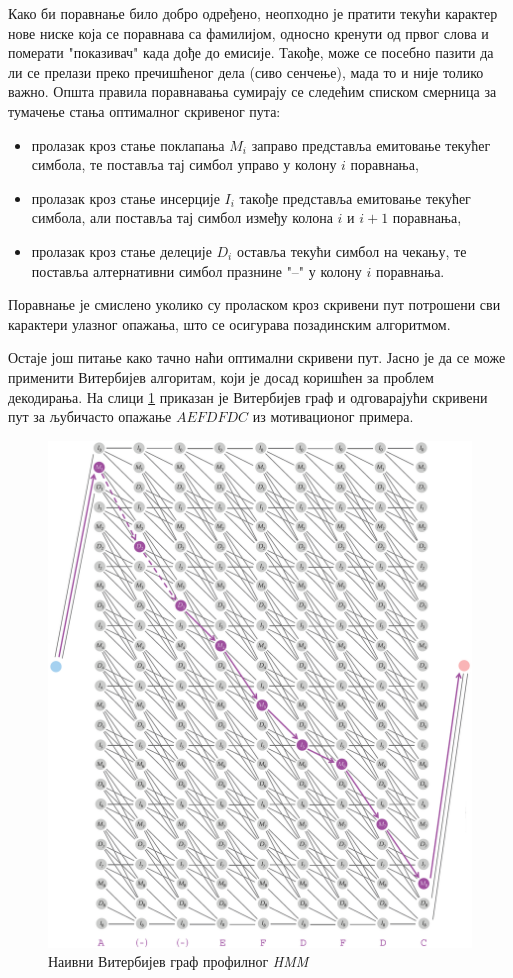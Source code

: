 \documentclass[12pt,oneside]{memoir}
\begin{document}
\begin{CJK}{UTF8}{ipxm}
Како би поравнање било добро одређено, неопходно је пратити текући карактер нове ниске која се поравнава са фамилијом, односно кренути од првог слова и померати "показивач" када дође до емисије. Такође, може се посебно пазити да ли се прелази преко пречишћеног дела (сиво сенчење), мада то и није толико важно. Општа правила поравнавања сумирају се следећим списком смерница за тумачење стања оптималног скривеног пута:
\begin{itemize}
  \item пролазак кроз стање поклапања $M_i$ заправо представља емитовање текућег симбола, те поставља тај симбол управо у колону $i$ поравнања,
  \item пролазак кроз стање инсерције $I_i$ такође представља емитовање текућег симбола, али поставља тај симбол између колона $i$ и $i+1$ поравнања,
  \item пролазак кроз стање делеције $D_i$ оставља текући симбол на чекању, те поставља алтернативни симбол празнине "--" у колону $i$ поравнања.
\end{itemize}
Поравнање је смислено уколико су проласком кроз скривени пут потрошени сви карактери улазног опажања, што се осигурава позадинским алгоритмом.

Остаје још питање како тачно наћи оптимални скривени пут. Јасно је да се може применити Витербијев алгоритам, који је досад коришћен за проблем декодирања. На слици \ref{fig:prof_vit} приказан је Витербијев граф и одговарајући скривени пут за љубичасто опажање $AEFDFDC$ из мотивационог примера.

\begin{figure}[H]
  \centering
  \includegraphics[width=\textwidth]{prof_vit.png}
  \caption{Наивни Витербијев граф профилног \textit{HMM}\cite{compeau2015}}
  \label{fig:prof_vit}
\end{figure}


\end{CJK}
\end{document}
